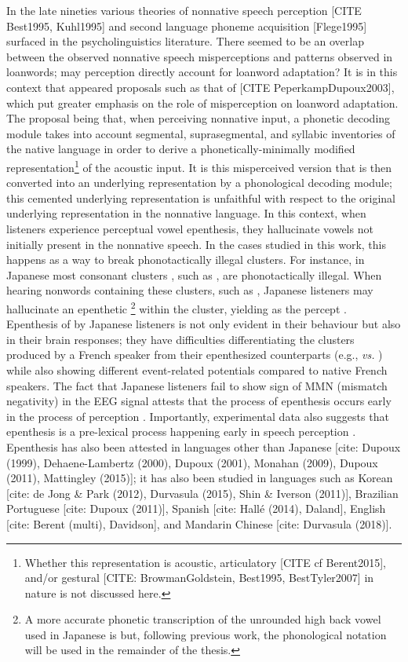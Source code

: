 In the late nineties various theories of nonnative speech perception [CITE Best1995, Kuhl1995] and second language phoneme acquisition [Flege1995] surfaced in the psycholinguistics literature. There seemed to be an overlap between the observed nonnative speech misperceptions and patterns observed in loanwords; may perception directly account for loanword adaptation?   
It is in this context that appeared proposals such as that of [CITE PeperkampDupoux2003], which put greater emphasis on the role of misperception on loanword adaptation. The proposal being that, when perceiving nonnative input, a phonetic decoding module takes into account segmental, suprasegmental, and syllabic inventories of the native language in order to derive a phonetically-minimally modified representation\footnote{Whether this representation is acoustic, articulatory [CITE cf Berent2015], and/or gestural [CITE: BrowmanGoldstein, Best1995, BestTyler2007] in nature is not discussed here.} of the acoustic input. It is this misperceived version that is then converted into an underlying representation by a phonological decoding module; this cemented underlying representation is unfaithful with respect to the original underlying representation in the nonnative language.  
In this context, when listeners experience perceptual vowel epenthesis, they hallucinate vowels not initially present in the nonnative speech. In the cases studied in this work, this happens as a way to break phonotactically illegal clusters. For instance, in Japanese most consonant clusters%
, such as , are phonotactically illegal. When hearing nonwords containing these clusters, such as , Japanese listeners may hallucinate an epenthetic \footnote{A more accurate phonetic transcription of the unrounded high back vowel used in Japanese is \textipa{[W]} but, following previous work, the phonological notation  will be used in the remainder of the thesis.} within the cluster, yielding  as the percept \cite{dupoux1999}. Epenthesis of  by Japanese listeners is not only evident in their behaviour but also in their brain responses; they have difficulties differentiating the clusters produced by a French speaker from their epenthesized counterparts (e.g.,  \textit{vs.} ) while also showing different event-related potentials compared to native French speakers. The fact that Japanese listeners fail to show sign of MMN (mismatch negativity) in the EEG signal attests that the process of epenthesis occurs early in the process of perception \cite{dehaene2000}. Importantly, experimental data also suggests that epenthesis is a pre-lexical process happening early in speech perception \cite{dupoux2001}.
Epenthesis has also been attested in languages other than Japanese [cite: Dupoux (1999), Dehaene-Lambertz (2000), Dupoux (2001), Monahan (2009), Dupoux (2011), Mattingley (2015)]; it has also been studied in languages such as Korean [cite: de Jong \& Park (2012), Durvasula (2015), Shin \& Iverson (2011)], Brazilian Portuguese [cite: Dupoux (2011)], Spanish [cite: Hallé (2014), Daland], English [cite: Berent (multi), Davidson], and Mandarin Chinese [cite: Durvasula (2018)].

